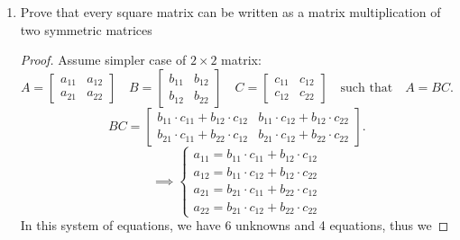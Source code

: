 \documentclass{zc-ust-hw}
\theoremstyle{definition}
\begin{document}
\maketitle

\begin{enumerate}

  \item Prove that every square matrix can be written as a matrix
    multiplication of two symmetric matrices

    \begin{proof}
      Assume simpler case of $2 \times 2$ matrix:
      \begin{equation}
        A=\begin{bmatrix} a_{11} & a_{12}\\ a_{21} & a_{22} \end{bmatrix}
        \quad
        B=\begin{bmatrix} b_{11} & b_{12} \\ b_{12} & b_{22} \end{bmatrix}
        \quad
        C=\begin{bmatrix} c_{11} & c_{12} \\ c_{12} & c_{22} \end{bmatrix}
        \quad
        \text{such that}
        \quad
        A=BC
      .\end{equation}
      \begin{equation}
        BC =
        \begin{bmatrix} 
          b_{11}\cdot c_{11} + b_{12}\cdot c_{12} & b_{11}\cdot c_{12} + b_{12}\cdot c_{22} \\
          b_{21}\cdot c_{11} + b_{22}\cdot c_{12} & b_{21}\cdot c_{12} + b_{22}\cdot c_{22}
        \end{bmatrix} 
      .\end{equation}
      \begin{equation}
        \implies \begin{cases}
          a_{11} = b_{11}\cdot c_{11} + b_{12}\cdot c_{12} \\
          a_{12} = b_{11}\cdot c_{12} + b_{12}\cdot c_{22} \\
          a_{21} = b_{21}\cdot c_{11} + b_{22}\cdot c_{12} \\
          a_{22} = b_{21}\cdot c_{12} + b_{22}\cdot c_{22}
        \end{cases}
      \end{equation}
      In this system of equations, we have 6 unknowns and 4 equations, thus we

\end{proof}
\end{enumerate}
\end{document}
